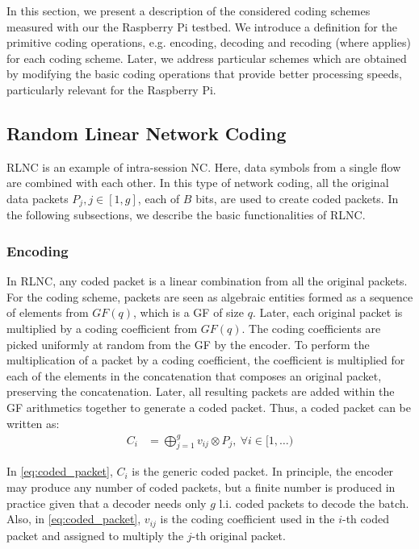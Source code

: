 \label{sec:schemes}

In this section, we present a description of the considered coding schemes
measured with our the Raspberry Pi testbed. We introduce a definition
for the primitive coding operations, e.g. encoding, decoding and recoding
(where applies) for each coding scheme. Later, we address particular schemes
which are obtained by modifying the basic coding operations that provide
better processing speeds, particularly relevant for the Raspberry Pi.

\subsection{Random Linear Network Coding}
\label{ssec:RLNC}

\ac{RLNC} is an example of intra-session \ac{NC}. Here, data symbols from a
single flow are combined with each other. In this type of network coding,
all the original data packets $P_j, j \in [1,g]$, each of $B$ bits, are used
to create coded packets. In the following subsections, we describe the
basic functionalities of \ac{RLNC}.

\subsubsection{Encoding}
In \ac{RLNC}, any coded packet is a linear combination from all
the original packets. For the coding scheme, packets are seen as
algebraic entities formed as a sequence of elements from $GF(q)$,
which is a \ac{GF} of size $q$. Later, each original packet is
multiplied by a coding coefficient from $GF(q)$. The coding coefficients
are picked uniformly at random from the \ac{GF} by the encoder. To
perform the multiplication of a packet by a coding coefficient, the
coefficient is multiplied for each of the elements in the
concatenation that composes an original packet, preserving the
concatenation. Later, all resulting packets are added within the
\ac{GF} arithmetics together to generate a coded packet. Thus, a
coded packet can be written as:
%
\begin{align} \label{eq:coded_packet}
C_i  &= \bigoplus_{j=1}^{g} v_{ij} \otimes P_j ,\ \forall i \in [1,\ldots)
\end{align}

In \eqref{eq:coded_packet}, $C_i$ is the generic coded packet. In principle,
the encoder may produce any number of coded packets, but a finite
number is produced in practice given that a decoder needs only
$g$ \ac{l.i.} coded packets to decode the batch. Also, in
\eqref{eq:coded_packet}, $v_{ij}$ is the coding coefficient used in the
$i$-th coded packet and assigned to multiply the $j$-th original packet.

